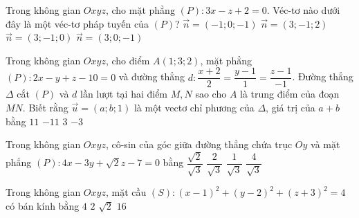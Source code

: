 \begin{ex}%
	Trong không gian $Oxyz$, cho mặt phẳng $(P)\colon 3x-z+2=0$. Véc-tơ nào dưới đây là một véc-tơ pháp tuyến của $(P)$?
	\choice
	{$\overrightarrow{n}=\left(-1;0;-1\right)$}
	{$\overrightarrow{n}=\left(3;-1;2\right)$}
	{$\overrightarrow{n}=\left(3;-1;0\right)$}
	{\True $\overrightarrow{n}=\left(3;0;-1\right)$}
\end{ex}
\begin{ex}%
	Trong không gian $Oxyz$, cho điểm $A(1 ; 3 ; 2)$, mặt phẳng $(P)\colon 2 x-y+z-10=0$  và đường thẳng  $d\colon \dfrac{x+2}{2}=\dfrac{y-1}{1}=\dfrac{z-1}{-1}$. Đường thẳng $\Delta$ cắt $(P)$ và $d$ lần lượt tại hai điểm $M, N$ sao cho $A$ là trung điểm của đoạn $MN$. Biết rằng $\vec{u}=(a ; b ; 1)$ là một vectơ chỉ phương của $\Delta$, giá trị của $a+b$ bằng
	\choice
	{$11$}
	{\True $-11$}
	{$3$}
	{$-3$}
\end{ex}
\begin{ex}%
	Trong không gian $Oxyz$, cô-sin của góc giữa đường thẳng chứa trục $Oy$ và mặt phẳng $(P)\colon 4x-3y+\sqrt{2}z-7=0$ bằng
	\choice
	{\True $\dfrac{\sqrt{2}}{\sqrt{3}}$}
	{$\dfrac{2}{\sqrt{3}}$}
	{$\dfrac{1}{\sqrt{3}}$}
	{$\dfrac{4}{\sqrt{3}}$}
\end{ex}
\begin{ex}%
	Trong không gian $Oxyz$, mặt cầu $(S)\colon (x-1)^2+(y-2)^2+(z+3)^2=4$ có bán kính bằng
	\choice
	{$4$}
	{\True $2$}
	{$\sqrt{2}$}
	{$16$}
\end{ex}
